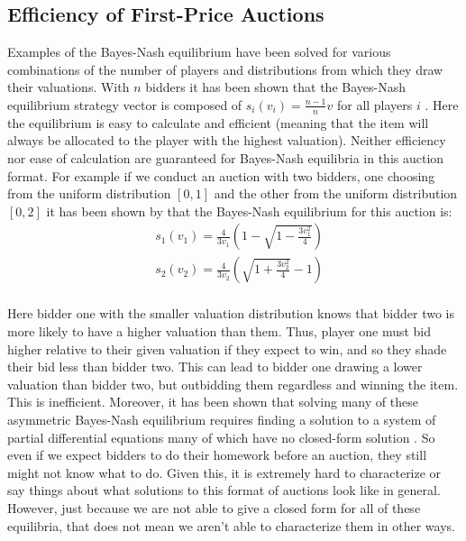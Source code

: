 \documentclass[12pt,twoside]{reedthesis}
\begin{document}
\subsection{Efficiency of First-Price Auctions}
Examples of the Bayes-Nash equilibrium have been solved for various combinations of the number of players and distributions from which they draw their valuations. With $n$ bidders it has been shown that the Bayes-Nash equilibrium strategy vector is composed of $s_i(v_i) = \frac{n-1}{n} v$ for all players $i$ \citep{Chawla2013}. Here the equilibrium is easy to calculate and efficient (meaning that the item will always be allocated to the player with the highest valuation). Neither efficiency nor ease of calculation are guaranteed for Bayes-Nash equilibria in this auction format. For example if we conduct an auction with two bidders, one choosing from the uniform distribution $[0,1]$ and the other from the uniform distribution $[0,2]$ it has been shown by \citet{Krishna2002} that the Bayes-Nash equilibrium for this auction is:
\begin{align*}
	&s_1(v_1) = \frac{4}{3 v_1} \left(1 - \sqrt{1 - \frac{3v_1^2}{4}}\right)\\
	&s_2(v_2) = \frac{4}{3 v_2} \left(\sqrt{1 + \frac{3v_2^2}{4}} - 1 \right)\\
\end{align*}

Here bidder one with the smaller valuation distribution knows that bidder two is more likely to have a higher valuation than them. Thus, player one must bid higher relative to their given valuation if they expect to win, and so they shade their bid less than bidder two. This can lead to bidder one drawing a lower valuation than bidder two, but outbidding them regardless and winning the item. This is inefficient. Moreover, it has been shown that solving many of these asymmetric Bayes-Nash equilibrium requires finding a solution to a system of partial differential equations many of which have no closed-form solution \citep{Roughgarden2017}. So even if we expect bidders to do their homework before an auction, they still might not know what to do. Given this, it is extremely hard to characterize or say things about what solutions to this format of auctions look like in general. However, just because we are not able to give a closed form for all of these equilibria, that does not mean we aren't able to characterize them in other ways.
\end{document}
